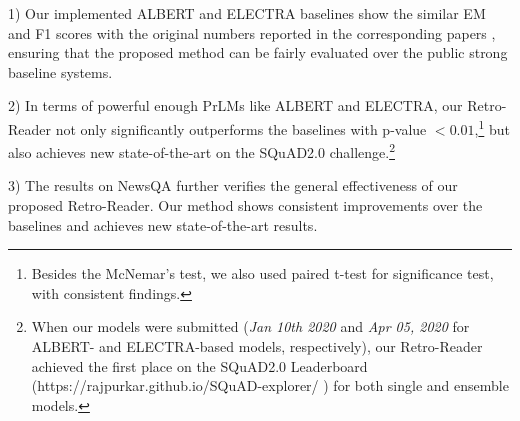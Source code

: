 \documentclass[letterpaper]{article} %
\begin{document}
1) Our implemented ALBERT and ELECTRA baselines show the similar EM and F1 scores with the original numbers reported in the corresponding papers \cite{Lan2020ALBERT,clark2019electra}, ensuring that the proposed method can be fairly evaluated over the public strong baseline systems.

2) In terms of powerful enough PrLMs like ALBERT and ELECTRA, our Retro-Reader not only significantly outperforms the baselines with p-value $<0.01$,\footnote{Besides the McNemar's test, we also used paired t-test for significance test, with consistent findings.} but also achieves new state-of-the-art on the SQuAD2.0 challenge.\footnote{When our models were submitted (\textit{Jan 10th 2020} and \textit{Apr 05, 2020} for ALBERT- and ELECTRA-based models, respectively), our Retro-Reader achieved the first place on the SQuAD2.0 Leaderboard (https://rajpurkar.github.io/SQuAD-explorer/ ) for both single and ensemble models.}

3) The results on NewsQA further verifies the general
effectiveness of our proposed Retro-Reader. Our method shows consistent improvements over the baselines and achieves new state-of-the-art results.
\end{document}
